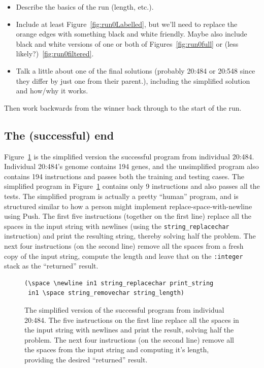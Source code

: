 \begin{itemize}
	\item Describe the basics of the run (length, etc.).
	\item Include at least Figure~\ref{fig:run0Labelled}, but we'll need to
	replace the orange edges with something black and white friendly. 
	Maybe also include 
	black and white versions of one or both of Figures~\ref{fig:run0full} or 
	(less likely?)~\ref{fig:run0filtered}.
	\item Talk a little about one of the final solutions (probably 20:484 or 20:548 since they differ by just one from their parent.), including the simplified solution and how/why it works.
\end{itemize}

Then work backwards from the winner back through to the start of the run.

\subsection{The (successful) end}

Figure~\ref{prog:simplified20:484} 
is the simplified version the successful program from 
individual 20:484. Individual 20:484's genome contains 194 genes, and the unsimplified 
program also contains 194 instructions and passes both
the training and testing cases. The simplified program in 
Figure~\ref{prog:simplified20:484} contains only 9 instructions and
also passes all the tests. 
The simplified program is actually a pretty ``human'' program, and is structured similar to 
how a person might implement replace-space-with-newline using Push. The first five 
instructions (together on the first line) replace all the spaces in the input string 
with newlines (using the \texttt{string\_replacechar} instruction) and print the 
resulting string, thereby solving half the problem. 
The next four instructions (on the second line) remove all the spaces from
a fresh copy of the input string, compute the length and leave that on the
\texttt{:integer} stack as the ``returned'' result.

\begin{figure}[h]
\begin{verbatim}
(\space \newline in1 string_replacechar print_string
 in1 \space string_removechar string_length)
\end{verbatim}
\caption{The simplified version of the successful program from individual 20:484. The
	five instructions on the first line replace all the spaces in the input string with newlines
	and print the result, solving half the problem. The next four instructions (on the second
	line) remove all the spaces from the input string and computing it's length, providing
	the desired ``returned'' result.}
\label{prog:simplified20:484}
\end{figure}

